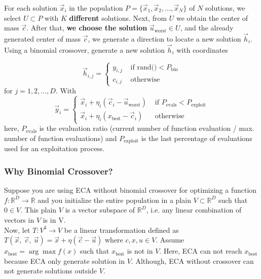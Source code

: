 \documentclass[12pt,letterpape]{article}
\begin{document}
For each solution $\vec{x}_i $ in the population 
$P = \{ \vec{x}_1, \vec{x}_2, \ldots, \vec{x}_{N} \} $ of $N$ 
solutions, we select $U \subset P $ with $K$ \textbf{different} solutions. Next, 
from $U$ we obtain the center of mass $\vec{c}$. After that, \textbf{we choose the solution}
$\vec{u}_{\text{worst}} \in U$, and the already generated center of mass $\vec{c}$,
we generate a direction to locate a new solution $ \vec{h}_i$. Using a binomial 
crossover, generate a new solution $\vec{h}_{i}$ with coordinates

%
\begin{equation}
	\vec{h}_{i,j} = 
	\begin{cases}
		y_{i,j} & \text{ if rand()} < P_{\text{bin}}\\
		c_{i,j} & \text{ otherwise}
	\end{cases}
	\label{eqn:newSol}
\end{equation}
% 
for $j = 1,2,\ldots,D$. With 
%
\begin{equation}
	\vec{y}_i = 
	\begin{cases}
		\vec{x}_i + \eta _{i} ( \vec{c}_i - \vec{u}_{ \text{worst} } ) 
		       & \text{ if } P_{\text{evals}} < P_{\text{exploit}} \\
		\vec{x}_i + \eta _{i} ( x_{\text{best}} - \vec{c}_i)
		       & \text{ otherwise}
	\end{cases}
	\label{eqn:vcu2}
\end{equation}
%
here, $ P_{\text{evals}}$ is the evaluation ratio (current number of function evaluation / max.
number of function evaluations) and  $P_{\text{exploit}}$ is the last percentage of
evaluations used for an exploitation process.\\
%


\subsubsection{Why Binomial Crossover?} %
\label{sub:why_binomial_crossover_}

Suppose you are using ECA without binomial crossover for optimizing a function 
$f:\mathbb{R}^D \to \mathbb{R}$ and you initialize the entire population in a 
plain $V \subset \mathbb{R}^D $ such that $0 \in V$. This plain $V$ is a vector 
subspace of $\mathbb{R}^D$, i.e. any linear combination of vectors in $V$ is in V.\\

Now, let $T:V^3 \to V$ be a linear transformation defined as 
$ T(\vec{x},\ \vec{c},\ \vec{u}) = \vec{x} + \eta ( \vec{c} - \vec{u} )$ where 
$c,x,u \in V$. Assume $x_\text{best} = \arg \max f(x)$ such that $x_\text{best} $
is not in $V$. Here, ECA can not reach $x_\text{best}$ because ECA only generate
solution in $V$. Although, ECA without crossover can not generate solutions outside $V$.
\end{document}
